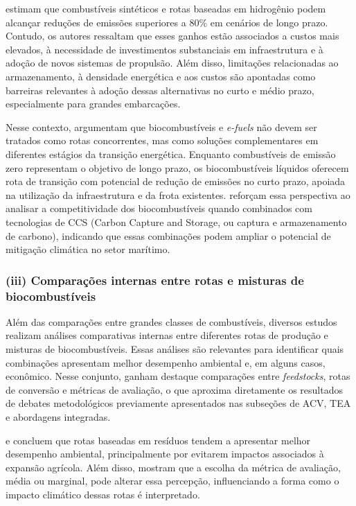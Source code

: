 \citet{lindstad_reduction_2021} estimam que combustíveis sintéticos e rotas baseadas em hidrogênio podem alcançar reduções de emissões superiores a 80\% em cenários de longo prazo. Contudo, os autores ressaltam que esses ganhos estão associados a custos mais elevados, à necessidade de investimentos substanciais em infraestrutura e à adoção de novos sistemas de propulsão. Além disso, limitações relacionadas ao armazenamento, à densidade energética e aos custos são apontadas como barreiras relevantes à adoção dessas alternativas no curto e médio prazo, especialmente para grandes embarcações.

Nesse contexto, \citet{kanchiralla_role_2024} argumentam que biocombustíveis e \emph{e-fuels} não devem ser tratados como rotas concorrentes, mas como soluções complementares em diferentes estágios da transição energética. Enquanto combustíveis de emissão zero representam o objetivo de longo prazo, os biocombustíveis líquidos oferecem rota de transição com potencial de redução de emissões no curto prazo, apoiada na utilização da infraestrutura e da frota existentes. \citet{mukherjee_techno-economic_2023} reforçam essa perspectiva ao analisar a competitividade dos biocombustíveis quando combinados com tecnologias de \gls{CCS} (Carbon Capture and Storage, ou captura e armazenamento de carbono), indicando que essas combinações podem ampliar o potencial de mitigação climática no setor marítimo.

\subsubsection{(iii) Comparações internas entre rotas e misturas de biocombustíveis}
Além das comparações entre grandes classes de combustíveis, diversos estudos realizam análises comparativas internas entre diferentes rotas de produção e misturas de biocombustíveis. Essas análises são relevantes para identificar quais combinações apresentam melhor desempenho ambiental e, em alguns casos, econômico. Nesse conjunto, ganham destaque comparações entre \emph{feedstocks}, rotas de conversão e métricas de avaliação, o que aproxima diretamente os resultados de debates metodológicos previamente apresentados nas subseções de \gls{ACV}, \gls{TEA} e abordagens integradas.

\citet{tan_biofuel_2021} e \citet{masum_comparing_2023} concluem que rotas baseadas em resíduos tendem a apresentar melhor desempenho ambiental, principalmente por evitarem impactos associados à expansão agrícola. Além disso, \citet{krantz_assessing_2023} mostram que a escolha da métrica de avaliação, média ou marginal, pode alterar essa percepção, influenciando a forma como o impacto climático dessas rotas é interpretado.

